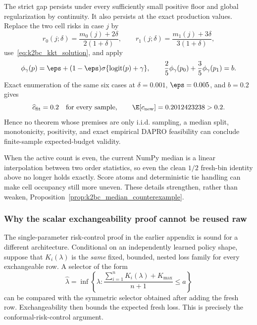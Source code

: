The strict gap persists under every sufficiently small positive floor and
global regularization by continuity.  It also persists at the exact
production values.  Replace the two cell risks in case $j$ by
\begin{equation}
 r_0(j;\delta)=\frac{m_0(j)+2\delta}{2(1+\delta)},
 \qquad
 r_1(j;\delta)=\frac{m_1(j)+3\delta}{3(1+\delta)},
\end{equation}
use~\eqref{eq:k2bc_kkt_solution}, and apply
\begin{equation}
 \phi_\gamma(p)=\eps+(1-\eps)
 \sigma\{\operatorname{logit}(p)+\gamma\},
 \qquad
 \frac25\phi_\gamma(p_0)+\frac35\phi_\gamma(p_1)=b.
\end{equation}
Exact enumeration of the same six cases at
$\delta=0.001$, $\eps=0.005$, and $b=0.2$ gives
\begin{equation}
    \widehat c_{\rm fit}=0.2
    \quad\hbox{for every sample},
    \qquad
    \E[c_{\rm new}]=0.2012423238>0.2.
    \label{eq:k2bc_exact_kkt_counterexample}
\end{equation}
Hence no theorem whose premises are only i.i.d. sampling, a median split,
monotonicity, positivity, and exact empirical DAPRO feasibility can conclude
finite-sample expected-budget validity.

When the active count is even, the current NumPy median is a linear
interpolation between two order statistics, so even the clean $1/2$ fresh-bin
identity above no longer holds exactly.  Score atoms and deterministic tie
handling can make cell occupancy still more uneven.  These details strengthen,
rather than weaken, Proposition~\ref{prop:k2bc_median_counterexample}.

\subsubsection{Why the scalar exchangeability proof cannot be reused raw}

The single-parameter risk-control proof in the earlier appendix is sound for
a different architecture.  Conditional on an independently learned policy
shape, suppose that $K_i(\lambda)$ is the \emph{same} fixed, bounded, nested
loss family for every exchangeable row.  A selector of the form
\begin{equation}
 \widehat\lambda=\inf\left\{\lambda:
 \frac{\sum_{i=1}^{n}K_i(\lambda)+K_{\max}}{n+1}\leq a\right\}
 \label{eq:k2bc_scalar_crc}
\end{equation}
can be compared with the symmetric selector obtained after adding the fresh
row.  Exchangeability then bounds the expected fresh loss.  This is precisely
the conformal-risk-control argument.

